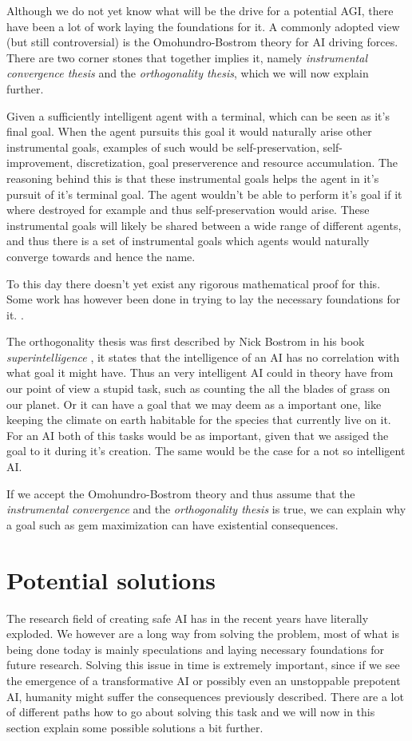 \documentclass[12pt,A4]{report}
\theoremstyle{definition}
\begin{document}
Although we do not yet know what will be the drive for a potential AGI, there have been a lot of work laying the foundations for it. A commonly adopted view (but still controversial) is the Omohundro-Bostrom theory for AI driving forces. There are two corner stones that together implies it, namely \textit{instrumental convergence thesis} and the \textit{orthogonality thesis}, which we will now explain further.

Given a sufficiently intelligent agent with a terminal, which can be seen as it's final goal. When the agent pursuits this goal it would naturally arise other instrumental goals, examples of such would be self-preservation, self-improvement, discretization, goal preserverence and resource accumulation. The reasoning behind this is that these instrumental goals helps the agent in it's pursuit of it's terminal goal. The agent wouldn't be able to perform it's goal if it where destroyed for example and thus self-preservation would arise. These instrumental goals will likely be shared between a wide range of different agents, and thus there is a set of instrumental goals which agents would naturally converge towards and hence the name. 

To this day there doesn't yet exist any rigorous mathematical proof for this. Some work has however been done in trying to lay the necessary foundations for it. \autocite{TURNER et al}.  

The orthogonality thesis was first described by Nick Bostrom in his book \textit{superintelligence} \cite{Bostrom}, it states that the intelligence of an AI has no correlation with what goal it might have. Thus an very intelligent AI could in theory have from our point of view a stupid task, such as counting the all the blades of grass on our planet. Or it can have a goal that we may deem as a important one, like keeping the climate on earth habitable for the species that currently live on it. For an AI both of this tasks would be as important, given that we assiged the goal to it during it's creation. The same would be the case for a not so intelligent AI.

If we accept the Omohundro-Bostrom theory and thus assume that the \textit{instrumental convergence} and the \textit{orthogonality thesis} is true, we can explain why a goal such as gem maximization can have existential consequences. 

\section{Potential solutions}
The research field of creating safe AI has in the recent years have literally exploded. We however are a long way from solving the problem, most of what is being done today is mainly speculations and laying necessary foundations for future research. Solving this issue in time is extremely important, since if we see the emergence of a transformative AI or possibly even an unstoppable prepotent AI, humanity might suffer the consequences previously described. There are a lot of different paths how to go about solving this task and we will now in this section explain some possible solutions a bit further.
\end{document}
